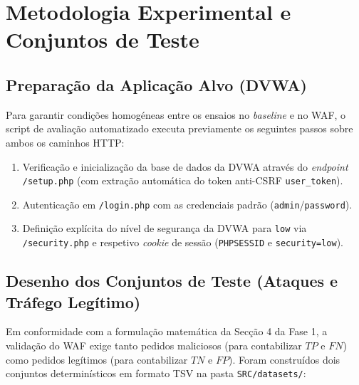 \documentclass[11pt,a4paper]{article}
\begin{document}
\clearpage
\section{Metodologia Experimental e Conjuntos de Teste}
\label{sec:metodologia_exp}

\subsection{Preparação da Aplicação Alvo (DVWA)}
Para garantir condições homogéneas entre os ensaios no \textit{baseline} e no WAF, o script de avaliação automatizado executa previamente os seguintes passos sobre ambos os caminhos HTTP:
\begin{enumerate}
    \item Verificação e inicialização da base de dados da DVWA através do \textit{endpoint} \texttt{/setup.php} (com extração automática do token anti-CSRF \texttt{user\_token}).
    \item Autenticação em \texttt{/login.php} com as credenciais padrão (\texttt{admin}/\texttt{password}).
    \item Definição explícita do nível de segurança da DVWA para \texttt{low} via \texttt{/security.php} e respetivo \textit{cookie} de sessão (\texttt{PHPSESSID} e \texttt{security=low}).
\end{enumerate}

\subsection{Desenho dos Conjuntos de Teste (Ataques e Tráfego Legítimo)}
Em conformidade com a formulação matemática da Secção 4 da Fase 1, a validação do WAF exige tanto pedidos maliciosos (para contabilizar $TP$ e $FN$) como pedidos legítimos (para contabilizar $TN$ e $FP$). Foram construídos dois conjuntos determinísticos em formato TSV na pasta \texttt{SRC/datasets/}:
\end{document}
